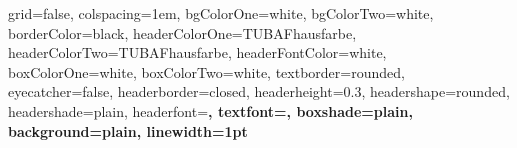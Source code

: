 \documentclass[portrait,final,a0paper,fontscale=0.277]{NTFDposter}
\begin{document}
\begin{poster}%
  {
  grid=false,
  colspacing=1em,
  bgColorOne=white,
  bgColorTwo=white,
  borderColor=black,
  headerColorOne=TUBAFhausfarbe,
  headerColorTwo=TUBAFhausfarbe,
  headerFontColor=white,
  boxColorOne=white,
  boxColorTwo=white,
  textborder=rounded,
  eyecatcher=false,
  headerborder=closed,
  headerheight=0.3\textheight,
  headershape=rounded,
  headershade=plain,
  headerfont=\Large\bf\textsc, %
  textfont={\setlength{\parindent}{1.5em}},
  boxshade=plain,
  background=plain,
  linewidth=1pt
  }
  {}
  {}
 
    \newcommand{\colouredcircle}{%
      \tikz{\useasboundingbox (-0.2em,-0.32em) rectangle(0.2em,0.32em); \draw[draw=black,fill=lightblue,line width=0.03em] (0,0) circle(0.18em);}}


\end{poster}
\end{document}
